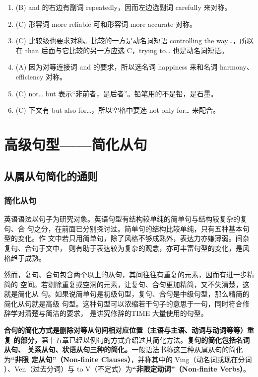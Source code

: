 \begin{enumerate}
\item (B) and 的右边有副词 repeatedly，因而左边选副词 carefully 来对称。

\item(C) 形容词 more reliable 可和形容词 more accurate 对称。

\item (C) 比较级也要求对称。比较的一方是动名词短语 controlling the way…，所以在 than 后面与它比较的另一方应选 C，trying to… 也是动名词短语。
\item (A) 因为对等连接词 and 的要求，所以选名词 happiness 来和名词 harmony、efficiency 对称。

\item  (C) not… but 表示“非前者，是后者”。铅笔用的不是铅，是石墨。

\item (C) 下文有 but also for…，所以空格中要选 not only for… 来配合。
\end{enumerate}


\part{高级句型——简化从句}

\chapter{从属从句简化的通则}

\section{简化从句}

英语语法以句子为研究对象。英语句型有结构较单纯的简单句与结构较复杂的复句、合
句之分，在前面已分别探讨过。简单句的结构比较单纯，只有五种基本句型的变化。作
文中若只用简单句，除了风格不够成熟外，表达力亦嫌薄弱。间杂复句、合句于文中，
则有助于表达较为复杂的观念，亦可丰富句型的变化，是风格趋于成熟。

然而，复句、合句包含两个以上的从句，其间往往有重复的元素，因而有进一步精简的
空间。若剔除重复或空洞的元素，让复句、合句更加精简，又不失清楚，这就是简化从
句。如果说简单句是初级句型，复句、合句是中级句型，那么精简的简化从句就是高级
句型。这种句型可以浓缩若干句子的意思于一句，同时符合修辞学对清楚与简洁的要求，
是讲究修辞的TIME 大量使用的句型。

\textbf{合句的简化方式是删除对等从句间相对应位置（主语与主语、动词与动词等等）重复
  的部分，}第十五章已经以例句的方式介绍过其简化方法。\textbf{复句的简化包括名词从句、
  关系从句、状语从句三种的简化。}一般语法书称这三种从属从句的简化为\textbf{“非限
  定从句”（Non-finite Clauses）}，并称其中的 Ving（动名词或现在分词
）、Ven（过去分词）与 to V（不定式）为\textbf{“非限定动词”（Non-finite Verbs）}。

